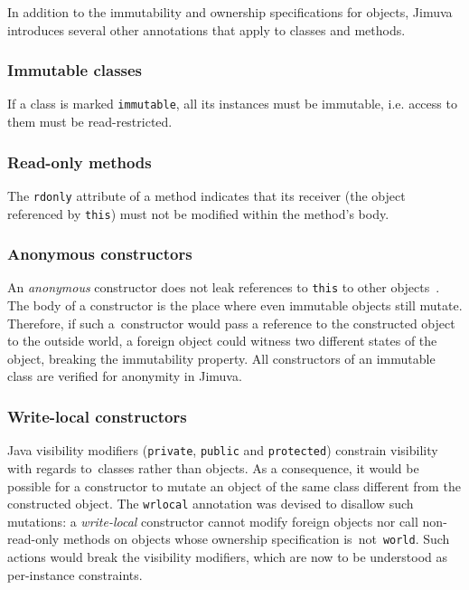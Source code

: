 \documentclass{pracamgr}
\theoremstyle{break}
\theoremstyle{break}
\theoremstyle{break}
\begin{document}
In addition to the immutability and ownership specifications for
objects, Jimuva introduces several other annotations that apply to
classes and methods.

\subsubsection{Immutable classes}

If a class is marked \texttt{immutable}, all its instances must be
immutable, i.e. access to them must be read-restricted.

\subsubsection{Read-only methods}

The \texttt{rdonly} attribute of a method indicates that its receiver
(the object referenced by \texttt{this}) must not be modified within
the method's body.

\subsubsection{Anonymous constructors}

An \emph{anonymous} constructor does not leak references to
\texttt{this} to other objects~\cite{vitek}. The body of a constructor
is the place where even immutable objects still mutate. Therefore, if
such a~constructor would pass a reference to the constructed object to
the outside world, a foreign object could witness two different states
of the object, breaking the immutability property. All constructors of
an immutable class are verified for anonymity in
Jimuva.

\subsubsection{Write-local constructors}
\label{sub:jimuva-wrlocal}

Java visibility modifiers (\texttt{private}, \texttt{public} and
\texttt{protected}) constrain visibility with regards to~classes
rather than objects. As a consequence, it would be possible for a
constructor to mutate an object of the same class different from the
constructed object. The \texttt{wrlocal} annotation was devised to
disallow such mutations: a \emph{write-local} constructor cannot
modify foreign objects nor call non-read-only methods on objects whose
ownership specification is~not~\texttt{world}. Such actions would
break the visibility modifiers, which are now to be understood as
per-instance constraints.
\end{document}
